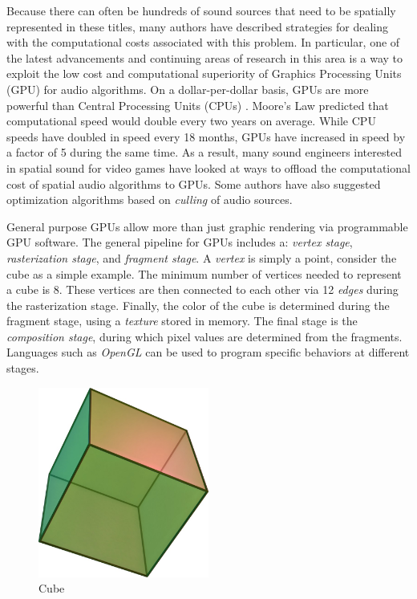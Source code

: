 Because there can often be hundreds of sound sources that need to be spatially represented in these titles, many authors have described strategies for dealing with the computational costs associated with this problem. In particular, one of the latest advancements and continuing areas of research in this area is a way to exploit the low cost and computational superiority of Graphics Processing Units (GPU) for audio algorithms. On a dollar-per-dollar basis, GPUs are more powerful than Central Processing Units (CPUs) \cite{hamid2009review}. Moore's Law predicted that computational speed would double every two years on average. While CPU speeds have doubled in speed every 18 months, GPUs have increased in speed by a factor of 5 during the same time. As a result, many sound engineers interested in spatial sound for video games have looked at ways to offload the computational cost of spatial audio algorithms to GPUs. Some authors have also suggested optimization algorithms based on \textit{culling} of audio sources.

General purpose GPUs allow more than just graphic rendering via programmable GPU software. The general pipeline for GPUs includes a: \textit{vertex stage}, \textit{rasterization stage}, and \textit{fragment stage}. A \textit{vertex} is simply a point, consider the cube as a simple example. The minimum number of vertices needed to represent a cube is 8. These vertices are then connected to each other via 12 \textit{edges} during the rasterization stage. Finally, the color of the cube is determined during the fragment stage, using a \textit{texture} stored in memory. The final stage is the \textit{composition stage}, during which pixel values are determined from the fragments. Languages such as \textit{OpenGL} can be used to program specific behaviors at different stages. 

\begin{figure}[ht!]%
\centering
\includegraphics[width=0.5\textwidth]{img/cube.jpg} 
\caption{Cube \cite{FileHexa46online}}
\label{fig:cube}
\end{figure}

